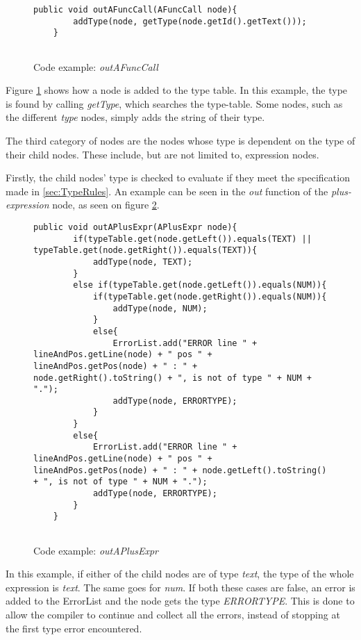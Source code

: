 \begin{figure}[H]
\centering
\begin{lstlisting}[]
    public void outAFuncCall(AFuncCall node){
        addType(node, getType(node.getId().getText()));
    }
    
\end{lstlisting}
\caption{Code example: \textit{outAFuncCall}}
\label{fig:outAFuncCall}
\end{figure}

Figure \ref{fig:outAFuncCall} shows how a node is added to the type table. In this example, the type is found by calling \textit{getType}, which searches the type-table. Some nodes, such as the different \textit{type} nodes, simply adds the string of their type.

The third category of nodes are the nodes whose type is dependent on the type of their child nodes. These include, but are not limited to, expression nodes.

Firstly, the child nodes' type is checked to evaluate if they meet the specification made in \ref{sec:TypeRules}. An example can be seen in the \textit{out} function of the \textit{plus-expression} node, as seen on figure \ref{fig:outAPlusExpr}.


\begin{figure}[H]
\centering
\begin{lstlisting}[]
    public void outAPlusExpr(APlusExpr node){
        if(typeTable.get(node.getLeft()).equals(TEXT) || typeTable.get(node.getRight()).equals(TEXT)){
            addType(node, TEXT);
        }
        else if(typeTable.get(node.getLeft()).equals(NUM)){
            if(typeTable.get(node.getRight()).equals(NUM)){
                addType(node, NUM);
            }
            else{
                ErrorList.add("ERROR line " + lineAndPos.getLine(node) + " pos " + lineAndPos.getPos(node) + " : " + node.getRight().toString() + ", is not of type " + NUM + ".");
                addType(node, ERRORTYPE);
            }
        }
        else{
            ErrorList.add("ERROR line " + lineAndPos.getLine(node) + " pos " + lineAndPos.getPos(node) + " : " + node.getLeft().toString() + ", is not of type " + NUM + ".");
            addType(node, ERRORTYPE);
        }
    }
    
\end{lstlisting}
\caption{Code example: \textit{outAPlusExpr}}
\label{fig:outAPlusExpr}
\end{figure}

In this example, if either of the child nodes are of type \textit{text}, the type of the whole expression is \textit{text}. The same goes for \textit{num}. If both these cases are false, an error is added to the ErrorList and the node gets the type \textit{ERRORTYPE}. This is done to allow the compiler to continue and collect all the errors, instead of stopping at the first type error encountered.

